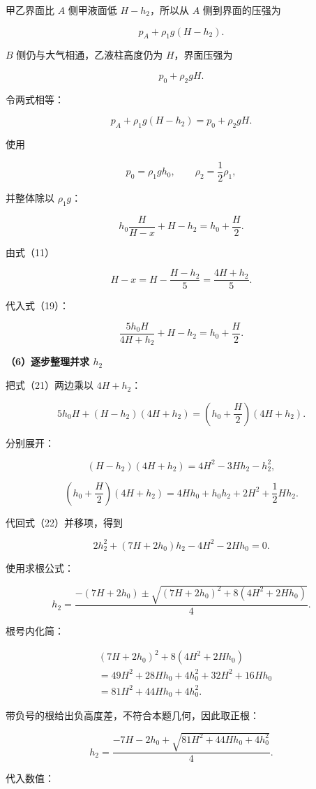 \documentclass[12pt,a4paper,UTF8]{ctexart}
\begin{document}
甲乙界面比 \(A\) 侧甲液面低 \(H-h_2\)，所以从 \(A\) 侧到界面的压强为

\[
p_A+\rho_1g(H-h_2).
\tag{16}
\]

\(B\) 侧仍与大气相通，乙液柱高度仍为 \(H\)，界面压强为

\[
p_0+\rho_2gH.
\tag{17}
\]

令两式相等：

\[
p_A+\rho_1g(H-h_2)
=p_0+\rho_2gH.
\tag{18}
\]

使用

\[
p_0=\rho_1gh_0,
\qquad
\rho_2=\frac12\rho_1,
\]

并整体除以 \(\rho_1g\)：

\[
h_0\frac{H}{H-x}+H-h_2
=h_0+\frac H2.
\tag{19}
\]

由式（11）

\[
H-x
=H-\frac{H-h_2}{5}
=\frac{4H+h_2}{5}.
\tag{20}
\]

代入式（19）：

\[
\frac{5h_0H}{4H+h_2}+H-h_2
=h_0+\frac H2.
\tag{21}
\]

\textbf{（6）逐步整理并求 \(h_2\)}

把式（21）两边乘以 \(4H+h_2\)：

\[
5h_0H+(H-h_2)(4H+h_2)
=\left(h_0+\frac H2\right)(4H+h_2).
\tag{22}
\]

分别展开：

\[
(H-h_2)(4H+h_2)
=4H^2-3Hh_2-h_2^2,
\tag{23}
\]

\[
\left(h_0+\frac H2\right)(4H+h_2)
=4Hh_0+h_0h_2+2H^2+\frac12Hh_2.
\tag{24}
\]

代回式（22）并移项，得到

\[
2h_2^2+(7H+2h_0)h_2
-4H^2-2Hh_0=0.
\tag{25}
\]

使用求根公式：

\[
h_2
=\frac{-(7H+2h_0)
\pm\sqrt{(7H+2h_0)^2+8(4H^2+2Hh_0)}}{4}.
\tag{26}
\]

根号内化简：

\[
\begin{aligned}
&(7H+2h_0)^2+8(4H^2+2Hh_0)\\
&=49H^2+28Hh_0+4h_0^2
+32H^2+16Hh_0\\
&=81H^2+44Hh_0+4h_0^2.
\end{aligned}
\tag{27}
\]

带负号的根给出负高度差，不符合本题几何，因此取正根：

\[
\boxed{
h_2
=\frac{-7H-2h_0
+\sqrt{81H^2+44Hh_0+4h_0^2}}{4}
}.
\tag{28}
\]

代入数值：
\end{document}
